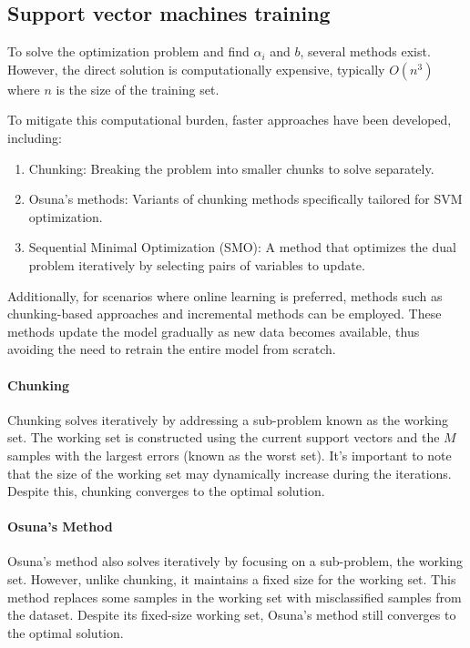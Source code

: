 \subsection{Support vector machines training}
To solve the optimization problem and find $\alpha_i$ and $b$, several methods exist. 
However, the direct solution is computationally expensive, typically $O(n^3)$ where $n$ is the size of the training set.

To mitigate this computational burden, faster approaches have been developed, including:
\begin{enumerate}
    \item Chunking: Breaking the problem into smaller chunks to solve separately.
    \item Osuna's methods: Variants of chunking methods specifically tailored for SVM optimization.
    \item Sequential Minimal Optimization (SMO): A method that optimizes the dual problem iteratively by selecting pairs of variables to update.
\end{enumerate}
Additionally, for scenarios where online learning is preferred, methods such as chunking-based approaches and incremental methods can be employed. 
These methods update the model gradually as new data becomes available, thus avoiding the need to retrain the entire model from scratch.

\paragraph*{Chunking}
Chunking solves iteratively by addressing a sub-problem known as the working set. 
The working set is constructed using the current support vectors and the $M$ samples with the largest errors (known as the worst set). 
It's important to note that the size of the working set may dynamically increase during the iterations. 
Despite this, chunking converges to the optimal solution.

\paragraph*{Osuna's Method}
Osuna's method also solves iteratively by focusing on a sub-problem, the working set. 
However, unlike chunking, it maintains a fixed size for the working set. 
This method replaces some samples in the working set with misclassified samples from the dataset. 
Despite its fixed-size working set, Osuna's method still converges to the optimal solution.

